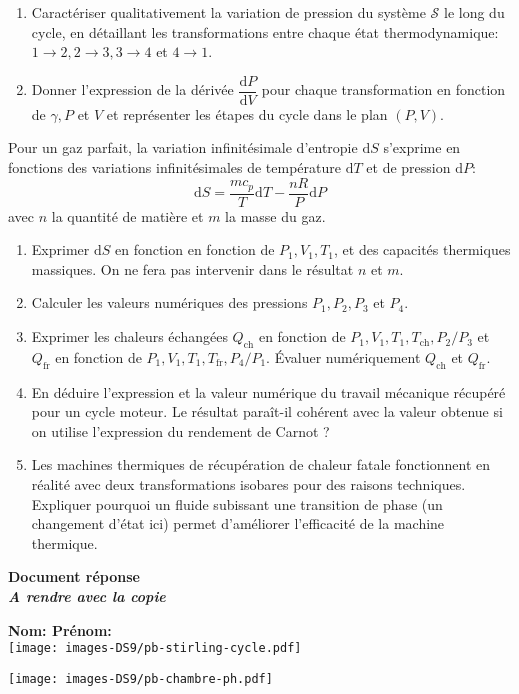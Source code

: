 \documentclass[
  10pt,
  french,
  a4paper,
  DIV=18]{scrartcl}
\newcommand{\derive}[2]{\dfrac{\mathrm{d}#1}{\mathrm{d}#2}}
\begin{document}
\begin{enumerate}
\def\labelenumi{\arabic{enumi}.}
\setcounter{enumi}{4}
\item
  Caractériser qualitativement la variation de pression du système
  \(\mathcal{S}\) le long du cycle, en détaillant les transformations
  entre chaque état thermodynamique: \(1 \to 2, 2 \to 3, 3 \to 4\) et
  \(4 \to 1\).
\item
  Donner l'expression de la dérivée \(\derive{P}{V}\) pour chaque
  transformation en fonction de \(\gamma, P\) et \(V\) et représenter
  les étapes du cycle dans le plan \((P,V)\).
\end{enumerate}

Pour un gaz parfait, la variation infinitésimale d'entropie
\(\mathrm{d} S\) s'exprime en fonctions des variations infinitésimales
de température \(\mathrm{d} T\) et de pression \(\mathrm{d} P\):
\[\mathrm{d}S = \frac{m c_p}{T} \mathrm{d}T - \frac{nR}{P}\mathrm{d}P \]
avec \(n\) la quantité de matière et \(m\) la masse du gaz.

\begin{enumerate}
\def\labelenumi{\arabic{enumi}.}
\setcounter{enumi}{6}
\item
  Exprimer \(\mathrm{d}S\) en fonction en fonction de
  \(P_1 , V_1, T_1\), et des capacités thermiques massiques. On ne fera
  pas intervenir dans le résultat \(n\) et \(m\).
\item
  Calculer les valeurs numériques des pressions \(P_1,P_2,P_3\) et
  \(P_4\).
\item
  Exprimer les chaleurs échangées \(Q_\mathrm{ch}\) en fonction de
  \(P_1 , V_1, T_1, T_\mathrm{ch}, P_2/P_3\) et \(Q_\mathrm{fr}\) en
  fonction de \(P_1 , V_1 , T_1, T_\mathrm{fr} , P_4/P_1\). Évaluer
  numériquement \(Q_\mathrm{ch}\) et \(Q_\mathrm{fr}\).
\item
  En déduire l'expression et la valeur numérique du travail mécanique
  récupéré pour un cycle moteur. Le résultat paraît-il cohérent avec la
  valeur obtenue si on utilise l'expression du rendement de Carnot ?
\item
  Les machines thermiques de récupération de chaleur fatale fonctionnent
  en réalité avec deux transformations isobares pour des raisons
  techniques. Expliquer pourquoi un fluide subissant une transition de
  phase (un changement d'état ici) permet d'améliorer l'efficacité de la
  machine thermique.
\end{enumerate}

\newpage

\begin{tcolorbox}
\centering\huge{\textbf{Document réponse \\\emph{A rendre avec la copie}}}
\end{tcolorbox}

\textbf{Nom: \hspace{7cm} Prénom:}\\

\texttt{[image: images-DS9/pb-stirling-cycle.pdf]}

\texttt{[image: images-DS9/pb-chambre-ph.pdf]}
\end{document}
